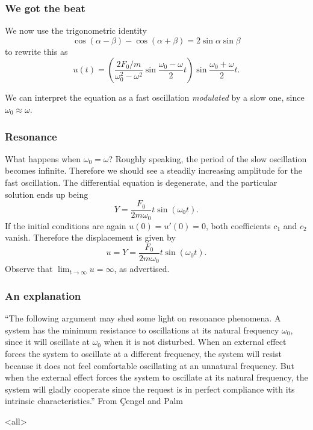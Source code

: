 \begin{frame}

\frametitle{We got the beat}
\label{wegotthebeat}

We now use the trigonometric identity
\[
    \cos{(\alpha - \beta)} - \cos{(\alpha + \beta)} = 2 \sin \alpha \sin \beta
\]
to rewrite this as
\[
    u(t) = \left( \frac{2F_0/m}{\omega_0^2 - \omega^2} \sin{\frac{\omega_0 - \omega}{2} t} \right) \sin{\frac{\omega_0 + \omega}{2} t}.
\]

We can interpret the equation as a fast oscillation \emph{modulated} by a slow one, since $ \omega_0 \approx \omega $.

\end{frame}

\begin{frame}

\frametitle{Resonance}
\label{resonance}

What happens when $ \omega_0 = \omega $? Roughly speaking, the period of the slow oscillation becomes infinite. Therefore we should see a steadily increasing amplitude for the fast oscillation. The differential equation is degenerate, and the particular solution ends up being
\[
    Y = \frac{F_0}{2m \omega_0}t \sin{(\omega_0 t)}.
\]
If the initial conditions are again $ u(0) = u'(0) = 0 $, both coefficients $ c_1 $ and $ c_2 $ vanish. Therefore the displacement is given by
\[
    u = Y = \frac{F_0}{2m \omega_0}t \sin{(\omega_0 t)}.
\]
Observe that $ \lim_{t \to \infty} u = \infty $, as advertised.

\end{frame}

\begin{frame}

\frametitle{An explanation}
\label{anexplanation}

``The following argument may shed some light on resonance phenomena. A system has the minimum resistance to oscillations at its natural frequency $ \omega_0 $, since it will oscillate at $ \omega_0 $ when it is not disturbed. When an external effect forces the system to oscillate at a different frequency, the system will resist because it does not feel comfortable oscillating at an unnatural frequency. But when the external effect forces the system to oscillate at its natural frequency, the system will gladly cooperate since the request is in perfect compliance with its intrinsic characteristics.'' From \c{C}engel and Palm

\end{frame}

\mode<all>


\mode*

